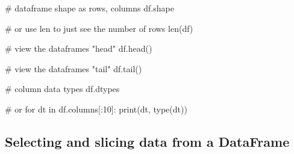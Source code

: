 \documentclass[
  letterpaper,
  DIV=11,
  numbers=noendperiod]{scrreprt}
\newenvironment{Shaded}{\begin{snugshade}}{\end{snugshade}}
\newcommand{\BuiltInTok}[1]{\textcolor[rgb]{0.00,0.23,0.31}{#1}}
\newcommand{\CommentTok}[1]{\textcolor[rgb]{0.37,0.37,0.37}{#1}}
\newcommand{\ControlFlowTok}[1]{\textcolor[rgb]{0.00,0.23,0.31}{#1}}
\newcommand{\DecValTok}[1]{\textcolor[rgb]{0.68,0.00,0.00}{#1}}
\newcommand{\KeywordTok}[1]{\textcolor[rgb]{0.00,0.23,0.31}{#1}}
\newcommand{\NormalTok}[1]{\textcolor[rgb]{0.00,0.23,0.31}{#1}}
\begin{document}
\begin{Shaded}
\begin{Highlighting}[]
\CommentTok{\# dataframe shape as rows, columns}
\NormalTok{df.shape}
\end{Highlighting}
\end{Shaded}

\begin{Shaded}
\begin{Highlighting}[]
\CommentTok{\# or use len to just see the number of rows}
\BuiltInTok{len}\NormalTok{(df)}
\end{Highlighting}
\end{Shaded}

\begin{Shaded}
\begin{Highlighting}[]
\CommentTok{\# view the dataframe\textquotesingle{}s "head"}
\NormalTok{df.head()}
\end{Highlighting}
\end{Shaded}

\begin{Shaded}
\begin{Highlighting}[]
\CommentTok{\# view the dataframe\textquotesingle{}s "tail"}
\NormalTok{df.tail()}
\end{Highlighting}
\end{Shaded}

\begin{Shaded}
\begin{Highlighting}[]
\CommentTok{\# column data types}
\NormalTok{df.dtypes}
\end{Highlighting}
\end{Shaded}

\begin{Shaded}
\begin{Highlighting}[]
\CommentTok{\# or}
\ControlFlowTok{for}\NormalTok{ dt }\KeywordTok{in}\NormalTok{ df.columns[:}\DecValTok{10}\NormalTok{]:}
    \BuiltInTok{print}\NormalTok{(dt, }\BuiltInTok{type}\NormalTok{(dt))}
\end{Highlighting}
\end{Shaded}

\hypertarget{selecting-and-slicing-data-from-a-dataframe}{%
\subsection{Selecting and slicing data from a
DataFrame}\label{selecting-and-slicing-data-from-a-dataframe}}
\end{document}

